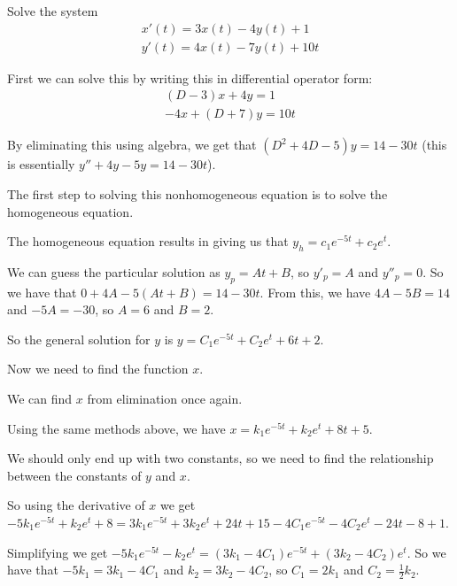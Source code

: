 \documentclass[../diffeq.tex]{subfiles}
\begin{document}
\pagebreak
\begin{example}
    Solve the system 
    \begin{align*}
        x'(t)=3x(t)-4y(t)+1 \\
        y'(t) = 4x(t)-7y(t)+10t
    \end{align*}

    First we can solve this by writing this in differential operator form:
    \begin{align*}
        (D-3)x+4y = 1\\
        -4x + (D+7)y = 10t 
    \end{align*}

    By eliminating this using algebra, we get that $(D^2+4D-5)y=14-30t$ (this is essentially $y''+4y-5y=14-30t$).

    The first step to solving this nonhomogeneous equation is to solve the homogeneous equation.

    The homogeneous equation results in giving us that $y_h = c_1e^{-5t}+c_2e^t$. 

    We can guess the particular solution as $y_p=At+B$, so $y'_p =A$ and $y''_p=0$. So we have that $0+4A-5(At+B)=14-30t$. From this, we have $4A-5B=14$ and $-5A=-30$, so $A=6$ and $B=2$.

    So the general solution for $y$ is $y=C_1e^{-5t}+C_2e^t+6t+2$.

    Now we need to find the function $x$.

    We can find $x$ from elimination once again.

    Using the same methods above, we have $x=k_1e^{-5t}+k_2e^t+8t+5$. 

    We should only end up with two constants, so we need to find the relationship between the constants of $y$ and $x$.

    So using the derivative of $x$ we get $-5k_1e^{-5t}+k_2e^t+8=3k_1e^{-5t}+3k_2e^t+24t+15-4C_1e^{-5t}-4C_2e^t-24t-8+1$.

    Simplifying we get $-5k_1e^{-5t}-k_2e^t = (3k_1-4C_1)e^{-5t}+(3k_2-4C_2)e^t$. So we have that $-5k_1=3k_1-4C_1$ and $k_2=3k_2-4C_2$, so $C_1=2k_1$ and $C_2=\frac{1}{2}k_2$.

    
\end{example}
\end{document}
